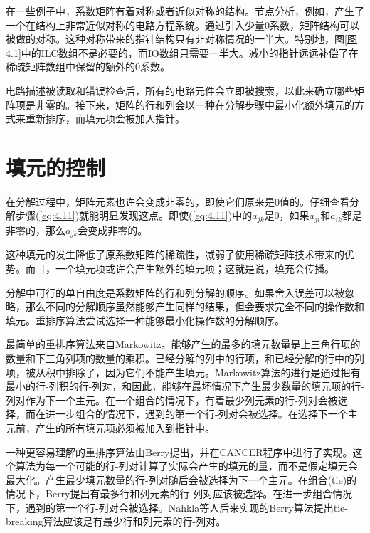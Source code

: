 在一些例子中，系数矩阵有着对称或者近似对称的结构。节点分析，例如，产生了一个在结构上非常近似对称的电路方程系统。通过引入少量0系数，矩阵结构可以被做的对称。这种对称带来的指针结构只有非对称情况的一半大\cite{ref-36}。特别地，图\ref{图4.1}中的ILC数组不是必要的，而IO数组只需要一半大。减小的指针远远补偿了在稀疏矩阵数组中保留的额外的0系数。

电路描述被读取和错误检查后，所有的电路元件会立即被搜索，以此来确立哪些矩阵项是非零的。接下来，矩阵的行和列会以一种在分解步骤中最小化额外填元的方式来重新排序，而填元项会被加入指针。

\section{填元的控制}
在分解过程中，矩阵元素也许会变成非零的，即使它们原来是0值的。仔细查看分解步骤(\ref{eq:4.11})就能明显发现这点。即使(\ref{eq:4.11})中的$a_{jk}$是0，如果$a_{ji}$和$a_{ik}$都是非零的，那么$a_{jk}$会变成非零的。

这种填元的发生降低了原系数矩阵的稀疏性，减弱了使用稀疏矩阵技术带来的优势。而且，一个填元项或许会产生额外的填元项；这就是说，填充会传播。

分解中可行的单自由度是系数矩阵的行和列分解的顺序。如果舍入误差可以被忽略，那么不同的分解顺序虽然能够产生同样的结果，但会要求完全不同的操作数和填元。重排序算法尝试选择一种能够最小化操作数的分解顺序。

最简单的重排序算法来自Markowitz\cite{ref-51}。能够产生的最多的填元数量是上三角行项的数量和下三角列项的数量的乘积。已经分解的列中的行项，和已经分解的行中的列项，被从积中排除了，因为它们不能产生填元。Markowitz算法的进行是通过把有最小的行-列积的行-列对，和因此，能够在最坏情况下产生最少数量的填元项的行-列对作为下一个主元。在一个组合的情况下，有着最少列元素的行-列对会被选择，而在进一步组合的情况下，遇到的第一个行-列对会被选择。在选择下一个主元前，产生的所有填元项必须被加入到指针中。

一种更容易理解的重排序算法由Berry\cite{ref-36}提出，并在CANCER程序中进行了实现\cite{ref-2}。这个算法为每一个可能的行-列对计算了实际会产生的填元的量，而不是假定填元会最大化。产生最少填元数量的行-列对随后会被选择为下一个主元。在组合(tie)的情况下，Berry提出有最多行和列元素的行-列对应该被选择。在进一步组合情况下，遇到的第一个行-列对会被选择。Nahkla等人\cite{ref-52}后来实现的Berry算法提出tie-breaking算法应该是有最少行和列元素的行-列对。

